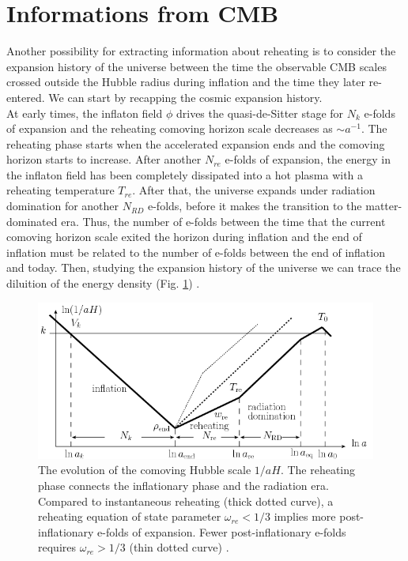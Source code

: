 \documentclass[11pt,a4paper,twoside]{book}
\begin{document}
\section{Informations from CMB}
Another possibility for extracting information about reheating is to consider the expansion history of the universe between the time the observable CMB scales crossed outside the Hubble radius during inflation and the time they later re-entered. We can start by recapping the cosmic expansion history.\\
At early times, the inflaton field $\phi$ drives the quasi-de-Sitter stage for $ N_{k} $ e-folds of expansion and the reheating comoving horizon scale decreases as $ \sim a^{-1} $. The reheating phase starts when the accelerated expansion ends and the comoving horizon starts to increase. After another $ N_{re} $ e-folds of expansion, the energy in the inflaton field has been completely dissipated into a hot plasma with a reheating temperature $ T_{re} $. After that, the universe expands under radiation domination for another $ N_{RD} $ e-folds, before it makes the transition to the matter-dominated era. Thus, the number of e-folds between the time that the current comoving horizon scale exited the horizon during inflation and the end of inflation must be related to the number of e-folds between the end of inflation and today. Then, studying the expansion history of the universe we can trace the diluition of the energy density (Fig. \ref{fig:daikamionkowsifig1}) \cite{Chap3:Kai_Kamionkowsy}. \\
\begin{figure}
	\centering
	\includegraphics[width=0.8\linewidth, height=0.3\textheight]{Images/Chap3/Dai_Kamionkowsi_Fig1}
	\caption{The evolution of the comoving Hubble scale $ 1/aH $. The reheating phase connects the inflationary phase and the radiation era. Compared to instantaneous reheating (thick dotted curve), a reheating equation of state parameter $ \omega_{re}<1/3 $ implies more post-inflationary e-folds of expansion. Fewer post-inflationary e-folds requires $ \omega_{re} > 1/3 $ (thin dotted curve) \cite{Chap3:Kai_Kamionkowsy}.}
	\label{fig:daikamionkowsifig1}
\end{figure}
\end{document}
